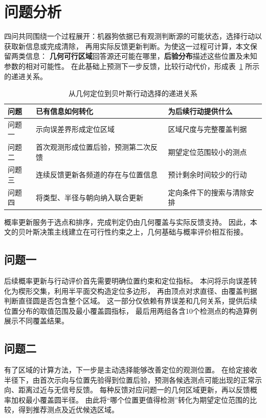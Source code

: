 \documentclass[UTF8,a4paper,12pt]{ctexart}
\begin{document}
\section{问题分析}

四问共同围绕一个过程展开：机器狗依据已有观测判断源的可能状态，选择行动以获取新信息或完成清除，
再用实际反馈更新判断。为使这一过程可计算，本文保留两类信息：
\textbf{几何可行区域}回答源还可能在哪里，\textbf{后验分布}描述这些位置及未知参数的相对可能性。
在此基础上预测下一步反馈，比较行动代价，形成表~\ref{tab:decision-thread} 所示的递进关系。

\begin{table}[htbp]
  \centering
  \caption{从几何定位到贝叶斯行动选择的递进关系}
  \label{tab:decision-thread}
  \small
  \begin{tabularx}{\linewidth}{lXX}
    \toprule
    问题 & 已有信息如何转化 & 为后续行动提供什么 \\
    \midrule
    问题一 & 示向误差界形成定位区域 & 区域尺度与完整覆盖判据 \\
    问题二 & 首次观测形成位置后验，预测第二次反馈 & 期望定位范围较小的测点 \\
    问题三 & 连续反馈更新各频道的存在与位置信息 & 预计剩余时间较少的行动 \\
    问题四 & 将类型、半径与朝向纳入联合更新 & 定向条件下的搜索与清除安排 \\
    \bottomrule
  \end{tabularx}
\end{table}

概率更新服务于选点和排序，完成判定仍由几何覆盖与实际反馈支持。
因此，本文的贝叶斯决策主线建立在可行性约束之上，几何基础与概率评价相互衔接。

\subsection{问题一}

后续概率更新与行动评价首先需要明确位置约束和定位指标。
本问将示向误差转化为楔形交集，利用半平面交构造定位多边形，
再由顶点对求直径、由覆盖判据判断直径圆是否包含整个区域。
这一部分仅依赖有界误差和几何关系，提供后续位置分布的取值范围及最小覆盖圆指标，
最后用两组各含10个检测点的构造算例展示不同覆盖结果。


\subsection{问题二}
有了区域的计算方法，下一步是主动选择能够改善定位的观测位置。
在给定接收半径下，由首次示向与位置先验得到位置后验，预测各候选测点可能出现的正常示向、距离过近与无信号反馈。
每种反馈对应问题一的几何区域更新，再以反馈概率加权最小覆盖圆半径。
由此将“哪个位置更值得检测”转化为期望定位范围的比较，得到推荐测点及近优候选区域。
\end{document}
